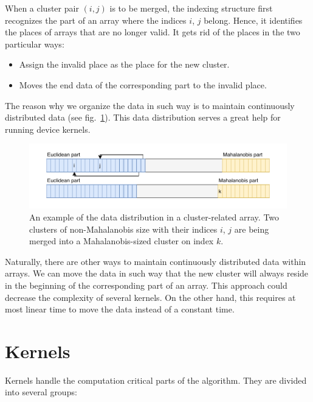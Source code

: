 When a cluster pair $(i,j)$ is to be merged, the indexing structure first recognizes the part of an array where the indices $i$, $j$ belong. Hence, it identifies the places of arrays that are no longer valid. It gets rid of the places in the two particular ways:
\begin{itemize}
	\item Assign the invalid place as the place for the new cluster.
	\item Moves the end data of the corresponding part to the invalid place.
\end{itemize}
The reason why we organize the data in such way is to maintain continuously distributed data (see fig.~\ref{fig03:data_order}). This data distribution serves a great help for running device kernels.

\begin{figure}\centering
	\includegraphics[width=\textwidth]{img/data}
	\caption{An example of the data distribution in a cluster-related array. Two clusters of non-Mahalanobis size with their indices $i$, $j$ are being merged into a Mahalanobis-sized cluster on index $k$.}
	\label{fig03:data_order}
\end{figure}

\begin{rem}
	Naturally, there are other ways to maintain continuously distributed data within arrays. We can move the data in such way that the new cluster will always reside in the beginning of the corresponding part of an array. This approach could decrease the complexity of several kernels. On the other hand, this requires at most linear time to move the data instead of a constant time.
\end{rem}

\section{Kernels}

Kernels handle the computation critical parts of the algorithm. They are divided into several groups:

